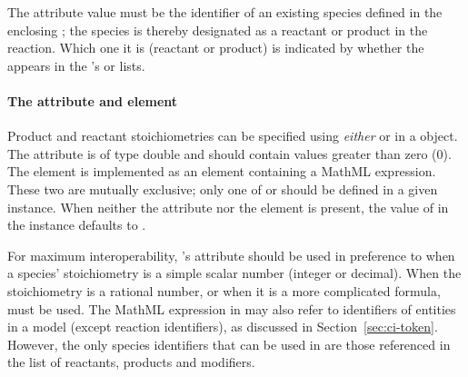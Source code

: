 The  attribute value must be the
identifier of an existing species defined in the enclosing \Model;
the species is thereby designated as a reactant or product in the
reaction.  Which one it is (\ie reactant or product) is indicated
by whether the \SpeciesReference appears in the \Reaction's
 or  lists.


\paragraph{The  attribute and 
  element}

Product and reactant stoichiometries can be specified using
\emph{either}  or 
in a \SpeciesReference object.  The 
attribute is of type double and should contain values greater than
zero (0).  The  element is implemented as
an element containing a MathML expression.  These two are
mutually exclusive; only one of  or
 should be defined in a given
\SpeciesReference instance.  When neither the attribute
  nor the element is present, the
value of  in the \SpeciesReference instance
defaults to .

For maximum interoperability, \SpeciesReference's  attribute
should be used in preference to  when a
species' stoichiometry is a simple scalar number (integer or
decimal).  When the stoichiometry is a rational number, or when it
is a more complicated formula,  must be
used.  The MathML expression in  may also
refer to identifiers of entities in a model (except reaction
identifiers), as discussed in Section~\ref{sec:ci-token}.
However, the only species identifiers that can be used in
 are those referenced in the \Reaction
list of reactants, products and modifiers.

